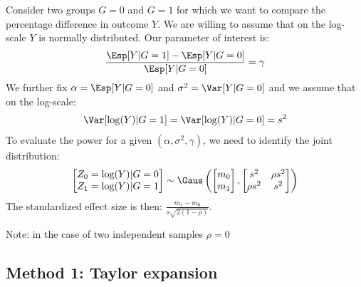 \documentclass[12pt]{article}
\begin{document}
Consider two groups \(G=0\) and \(G=1\) for which we want to compare
the percentage difference in outcome \(Y\). We are willing to assume
that on the log-scale \(Y\) is normally distributed. Our parameter of
interest is:
\begin{align*}
\frac{\Esp[Y|G=1]-\Esp[Y|G=0]}{\Esp[Y|G=0]} = \gamma
\end{align*}
We further fix \(\alpha = \Esp[Y|G=0]\) and \(\sigma^2 = \Var[Y|G=0]\)
and we assume that on the log-scale:
\begin{align*}
\Var[\log(Y)|G=1]  = \Var[\log(Y)|G=0] = s^2
\end{align*}
To evaluate the power for a given \((\alpha,\sigma^2,\gamma)\), we need to identify the joint distribution: 
\begin{align*}
\begin{bmatrix}
Z_0 = \log(Y)|G=0 \\ Z_1  = \log(Y)|G=1
\end{bmatrix}
\sim \Gaus \left(
\begin{bmatrix}
m_0 \\ m_1
\end{bmatrix}
,
\begin{bmatrix}
s^2 & \rho s^2 \\ \rho s^2 & s^2
\end{bmatrix}
\right)
\end{align*}
The standardized effect size is then: \(\frac{m_1-m_0}{s\sqrt{2(1-\rho)}}\). 

\bigskip

Note: in the case of two independent samples \(\rho=0\)

\subsection{Method 1: Taylor expansion}
\label{sec:orgec6be2e}
\end{document}
